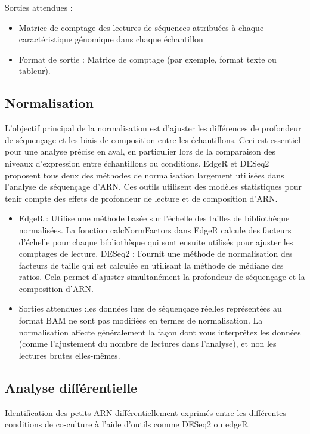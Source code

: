 \documentclass{report}
\begin{document}
\noindent Sorties attendues :
\begin{itemize}
    \item Matrice de comptage des lectures de séquences attribuées à chaque caractéristique génomique dans chaque échantillon
    \item Format de sortie : Matrice de comptage (par exemple, format texte ou tableur).
\end{itemize}

\subsection{Normalisation}
L’objectif principal de la normalisation est d’ajuster les différences de profondeur de séquençage et les biais de composition entre les échantillons. Ceci est essentiel pour une analyse précise en aval, en particulier lors de la comparaison des niveaux d’expression entre échantillons ou conditions.
EdgeR\cite{robinson2010edger} et DESeq2\cite{love2014moderated} proposent tous deux des méthodes de normalisation largement utilisées dans l’analyse de séquençage d’ARN. Ces outils utilisent des modèles statistiques pour tenir compte des effets de profondeur de lecture et de composition d’ARN. \\

\begin{itemize}
    \item EdgeR : Utilise une méthode basée sur l'échelle des tailles de bibliothèque normalisées. La fonction calcNormFactors dans EdgeR calcule des facteurs d'échelle pour chaque bibliothèque qui sont ensuite utilisés pour ajuster les comptages de lecture.
    DESeq2 : Fournit une méthode de normalisation des facteurs de taille qui est calculée en utilisant la méthode de médiane des ratios. Cela permet d'ajuster simultanément la profondeur de séquençage et la composition d'ARN.
    \item Sorties attendues :les données lues de séquençage réelles représentées au format BAM ne sont pas modifiées en termes de normalisation. La normalisation affecte généralement la façon dont vous interprétez les données (comme l'ajustement du nombre de lectures dans l'analyse), et non les lectures brutes elles-mêmes.
\end{itemize}

\subsection{Analyse différentielle}
Identification des petits ARN différentiellement exprimés entre les différentes conditions de co-culture à l'aide d'outils comme DESeq2 \cite{love2014moderated} ou edgeR\cite{robinson2010edger}.\\
\end{document}
